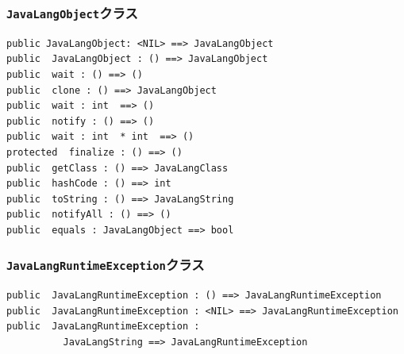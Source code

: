 \documentclass[\pformat,12pt]{jarticle}
\begin{document}
\subsubsection{\texttt{JavaLangObject}クラス}
\begin{small}
\begin{verbatim}
public JavaLangObject: <NIL> ==> JavaLangObject
public  JavaLangObject : () ==> JavaLangObject
public  wait : () ==> ()
public  clone : () ==> JavaLangObject
public  wait : int  ==> ()
public  notify : () ==> ()
public  wait : int  * int  ==> ()
protected  finalize : () ==> ()
public  getClass : () ==> JavaLangClass
public  hashCode : () ==> int
public  toString : () ==> JavaLangString
public  notifyAll : () ==> ()
public  equals : JavaLangObject ==> bool
\end{verbatim}
\end{small}

\subsubsection{\texttt{JavaLangRuntimeException}クラス}
\begin{small}
\begin{verbatim}
public  JavaLangRuntimeException : () ==> JavaLangRuntimeException
public  JavaLangRuntimeException : <NIL> ==> JavaLangRuntimeException
public  JavaLangRuntimeException : 
          JavaLangString ==> JavaLangRuntimeException
\end{verbatim}
\end{small}
\end{document}
